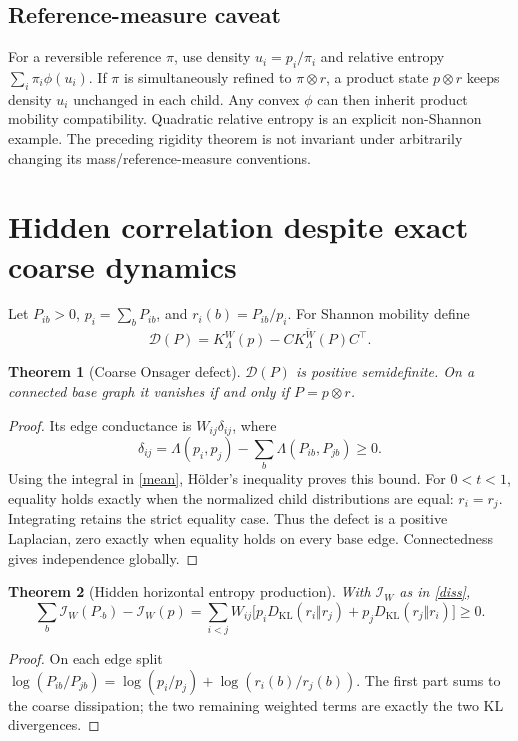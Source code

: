 \documentclass[11pt,a4paper]{article}
\newtheorem{theorem}{Theorem}
\newcommand{\KL}{D_{\mathrm{KL}}}
\begin{document}
\subsection{Reference-measure caveat}

For a reversible reference \(\pi\), use density \(u_i=p_i/\pi_i\) and
relative entropy \(\sum_i\pi_i\phi(u_i)\).
If \(\pi\) is simultaneously refined to \(\pi\otimes r\), a product
state \(p\otimes r\) keeps density \(u_i\) unchanged in each child.
Any convex \(\phi\) can then inherit product mobility compatibility.
Quadratic relative entropy is an explicit non-Shannon example.
The preceding rigidity theorem is not invariant under arbitrarily changing
its mass/reference-measure conventions.

\section{Hidden correlation despite exact coarse dynamics}

Let \(P_{ib}>0\), \(p_i=\sum_bP_{ib}\), and \(r_i(b)=P_{ib}/p_i\).
For Shannon mobility define
\[
\mathcal D(P)=K_\Lambda^W(p)-
CK_\Lambda^{\widetilde W}(P)C^\top.
\]

\begin{theorem}[Coarse Onsager defect]
\(\mathcal D(P)\) is positive semidefinite. On a connected base graph it
vanishes if and only if \(P=p\otimes r\).
\end{theorem}
\begin{proof}
Its edge conductance is \(W_{ij}\delta_{ij}\), where
\[
\delta_{ij}=\Lambda(p_i,p_j)-
\sum_b\Lambda(P_{ib},P_{jb})\ge0.
\]
Using the integral in \eqref{mean}, H\"older's inequality proves this bound.
For \(0<t<1\), equality holds exactly when the normalized child distributions
are equal: \(r_i=r_j\). Integrating retains the strict equality case.
Thus the defect is a positive Laplacian, zero exactly when equality holds
on every base edge. Connectedness gives independence globally.
\end{proof}

\begin{theorem}[Hidden horizontal entropy production]
With \(\mathcal I_W\) as in \eqref{diss},
\[
\boxed{
\sum_b\mathcal I_W(P_{\cdot b})-\mathcal I_W(p)
=\sum_{i<j}W_{ij}
\big[p_i\KL(r_i\Vert r_j)+p_j\KL(r_j\Vert r_i)\big]\ge0.}
\]
\end{theorem}
\begin{proof}
On each edge split
\(\log(P_{ib}/P_{jb})=\log(p_i/p_j)+\log(r_i(b)/r_j(b))\).
The first part sums to the coarse dissipation; the two remaining weighted
terms are exactly the two KL divergences.
\end{proof}
\end{document}
